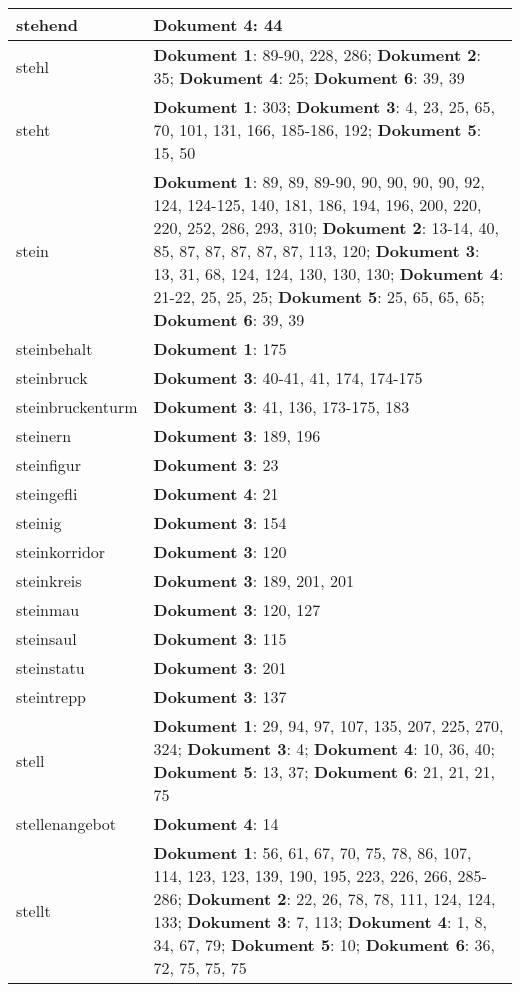 \documentclass[a5paper]{article}
\begin{document}
\begin{longtable}[l]{|l|p{3in}|}
\hline
stehend & \textbf{Dokument 4}: 44 \\
\hline
stehl & \textbf{Dokument 1}: 89-90, 228, 286; \textbf{Dokument 2}: 35; \textbf{Dokument 4}: 25; \textbf{Dokument 6}: 39, 39 \\
\hline
steht & \textbf{Dokument 1}: 303; \textbf{Dokument 3}: 4, 23, 25, 65, 70, 101, 131, 166, 185-186, 192; \textbf{Dokument 5}: 15, 50 \\
\hline
stein & \textbf{Dokument 1}: 89, 89, 89-90, 90, 90, 90, 90, 92, 124, 124-125, 140, 181, 186, 194, 196, 200, 220, 220, 252, 286, 293, 310; \textbf{Dokument 2}: 13-14, 40, 85, 87, 87, 87, 87, 87, 113, 120; \textbf{Dokument 3}: 13, 31, 68, 124, 124, 130, 130, 130; \textbf{Dokument 4}: 21-22, 25, 25, 25; \textbf{Dokument 5}: 25, 65, 65, 65; \textbf{Dokument 6}: 39, 39 \\
\hline
steinbehalt & \textbf{Dokument 1}: 175 \\
\hline
steinbruck & \textbf{Dokument 3}: 40-41, 41, 174, 174-175 \\
\hline
steinbruckenturm & \textbf{Dokument 3}: 41, 136, 173-175, 183 \\
\hline
steinern & \textbf{Dokument 3}: 189, 196 \\
\hline
steinfigur & \textbf{Dokument 3}: 23 \\
\hline
steingefli & \textbf{Dokument 4}: 21 \\
\hline
steinig & \textbf{Dokument 3}: 154 \\
\hline
steinkorridor & \textbf{Dokument 3}: 120 \\
\hline
steinkreis & \textbf{Dokument 3}: 189, 201, 201 \\
\hline
steinmau & \textbf{Dokument 3}: 120, 127 \\
\hline
steinsaul & \textbf{Dokument 3}: 115 \\
\hline
steinstatu & \textbf{Dokument 3}: 201 \\
\hline
steintrepp & \textbf{Dokument 3}: 137 \\
\hline
stell & \textbf{Dokument 1}: 29, 94, 97, 107, 135, 207, 225, 270, 324; \textbf{Dokument 3}: 4; \textbf{Dokument 4}: 10, 36, 40; \textbf{Dokument 5}: 13, 37; \textbf{Dokument 6}: 21, 21, 21, 75 \\
\hline
stellenangebot & \textbf{Dokument 4}: 14 \\
\hline
stellt & \textbf{Dokument 1}: 56, 61, 67, 70, 75, 78, 86, 107, 114, 123, 123, 139, 190, 195, 223, 226, 266, 285-286; \textbf{Dokument 2}: 22, 26, 78, 78, 111, 124, 124, 133; \textbf{Dokument 3}: 7, 113; \textbf{Dokument 4}: 1, 8, 34, 67, 79; \textbf{Dokument 5}: 10; \textbf{Dokument 6}: 36, 72, 75, 75, 75 \\

\end{longtable}
\end{document}

